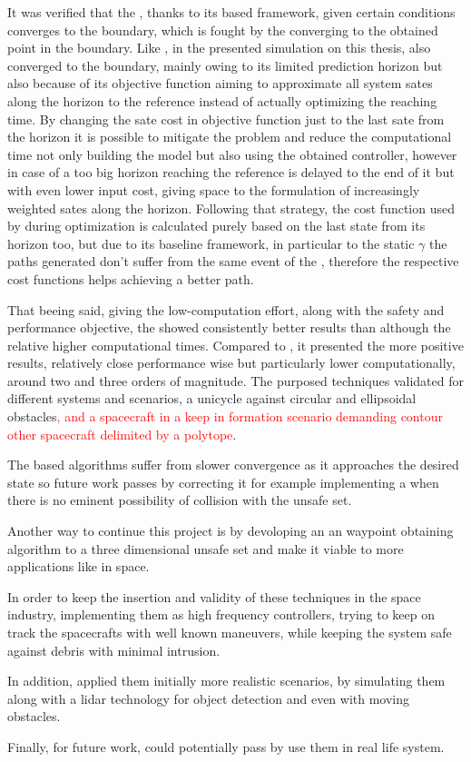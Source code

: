 It was verified that the , thanks to its based framework, given certain conditions converges to the boundary, which is fought by the  converging to the obtained point in the boundary. Like , in the presented simulation on this thesis,  also converged to the boundary, mainly owing to its limited prediction horizon but also because of its objective function aiming to approximate all system sates along the horizon to the reference instead of actually optimizing the reaching time. By changing the sate cost in objective function just to the last sate from the horizon it is possible to mitigate the problem and reduce the computational time not only building the  model but also using the obtained controller, however in case of a too big horizon reaching the reference is delayed to the end of it but with even lower input cost, giving space to the formulation of increasingly weighted sates along the horizon. Following that strategy, the cost function used by  during optimization is calculated purely based on the last state from its horizon too, but due to its baseline framework, in particular to the static \(\gamma\) the paths generated don't suffer from the same event of the , therefore the respective cost functions helps achieving a better path.       

That beeing said, giving the low-computation effort, along with the safety and performance objective, the  showed consistently better results than  although the relative higher computational times. Compared to , it presented the more positive results, relatively close performance wise but particularly lower computationally, around two and three orders of magnitude. The purposed techniques validated for different systems and scenarios, a unicycle against circular and ellipsoidal obstacles\textcolor{red}{, and a spacecraft in a keep in formation scenario demanding contour other spacecraft delimited by a polytope}.  

The  based algorithms suffer from slower convergence as it approaches the desired state so future work passes by correcting it for example implementing a  when there is no eminent possibility of collision with the unsafe set. 

Another way to continue this project is by devoloping an an waypoint obtaining algorithm to a three dimensional unsafe set and make it viable to more applications like in space. 

In order to keep the insertion and validity of these techniques in the space industry, implementing them as high frequency controllers, trying to keep on track the spacecrafts with well known maneuvers, while keeping the system safe against debris with minimal intrusion.  

In addition, applied them initially more realistic scenarios, by simulating them along with a lidar technology for object detection and even with moving obstacles.

Finally, for future work, could potentially pass by use them in real life system. 